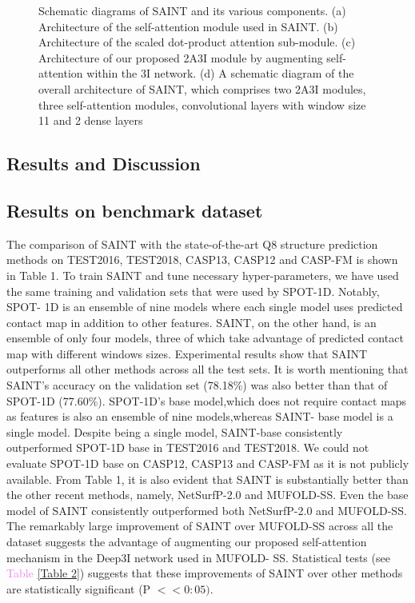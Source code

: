 \documentclass[11 pt, a4paper]{article}
\begin{document}
\begin{figure}
\caption{Schematic diagrams of SAINT and its various
components. (a) Architecture of the self-attention module 
used in SAINT. (b) Architecture of the scaled dot-product 
attention sub-module. (c) Architecture of our proposed 2A3I
module by augmenting self-attention within the 3I network.
(d) A schematic diagram of the overall architecture of
SAINT, which comprises two 2A3I modules, three self-attention
modules, convolutional layers with window size 11 and 2 dense
layers}
\label{figure 1}
    
\end{figure}

\begin{multicols}{2}
\newpage
\section{Results and Discussion}
\subsection{Results on benchmark dataset}
The comparison of SAINT with the state-of-the-art Q8 structure
prediction methods on TEST2016, TEST2018, CASP13, CASP12
and CASP-FM is shown in Table 1. To train SAINT and tune 
necessary hyper-parameters, we have used the same training
and validation sets that were used by SPOT-1D. Notably, SPOT-
1D is an ensemble of nine models where each single model uses
predicted contact map in addition to other features. SAINT,
on the other hand, is an ensemble of only four models, three
of which take advantage of predicted contact map with
different windows sizes. Experimental results show that SAINT 
outperforms all other  methods across all the test sets. It
is worth mentioning that SAINT’s accuracy on the validation 
set (78.18\%) was also better than that of SPOT-1D (77.60\%). 
SPOT-1D’s base model,which does not require contact maps as
features is also an ensemble of nine models,whereas SAINT-
base model is a single model. Despite being a single model,
SAINT-base consistently outperformed SPOT-1D base in TEST2016 
and TEST2018. We could not evaluate SPOT-1D base on CASP12,
CASP13 and CASP-FM as it is not publicly available. From 
Table 1, it is also evident that SAINT is substantially
better than the other recent methods, namely, NetSurfP-2.0 
and MUFOLD-SS. Even the base model of SAINT consistently
outperformed both NetSurfP-2.0 and MUFOLD-SS. The remarkably
large  improvement of SAINT over MUFOLD-SS across all the
dataset suggests the advantage of augmenting our proposed
self-attention mechanism in the Deep3I network used in MUFOLD-
SS. Statistical tests (see \textcolor{violet}{Table} \ref{Table 2}) suggests that these 
improvements of SAINT over other methods are statistically
significant (P $<<0:05)$. \par
\end{multicols}
\end{document}
